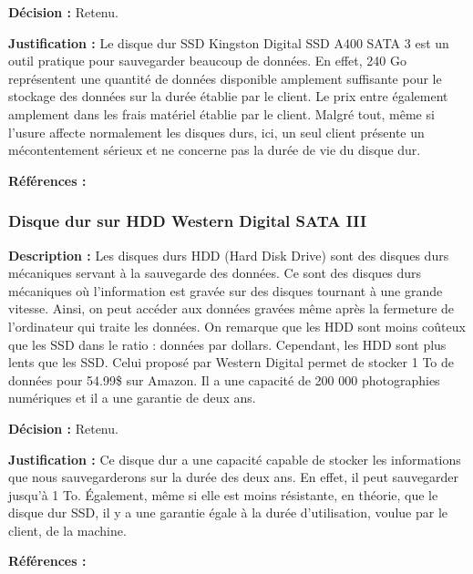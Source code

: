 \textbf{Décision :} Retenu.

\textbf{Justification :} Le disque dur SSD Kingston Digital SSD A400 SATA 3 est un outil pratique pour sauvegarder beaucoup de données. En effet, 240 Go représentent une quantité de données disponible amplement suffisante pour le stockage des données sur la durée établie par le client. Le prix entre également amplement dans les frais matériel établie par le client. Malgré tout, même si l’usure affecte normalement les disques durs, ici, un seul client présente un mécontentement sérieux et ne concerne pas la durée de vie du disque dur.

\textbf{Références :} \cite{AMSSD} \cite{DESSD}

\subsubsection{Disque dur sur HDD Western Digital SATA III }

\textbf{Description :} Les disques durs HDD (Hard Disk Drive) sont des disques durs mécaniques servant à la sauvegarde des données. Ce sont des disques durs mécaniques où l’information est gravée sur des disques tournant à une grande vitesse. Ainsi, on peut accéder aux données gravées même après la fermeture de l’ordinateur qui traite les données. On remarque que les HDD sont moins coûteux que les SSD dans le ratio : données par dollars. Cependant, les HDD sont plus lents que les SSD. Celui proposé par Western Digital permet de stocker 1 To de données pour 54.99\$ sur Amazon. Il a une capacité de 200 000 photographies numériques et il a une garantie de deux ans. 

\textbf{Décision :} Retenu.

\textbf{Justification :} Ce disque dur a une capacité capable de stocker les informations que nous sauvegarderons sur la durée des deux ans. En effet, il peut sauvegarder jusqu’à 1 To. Également, même si elle est moins résistante, en théorie, que le disque dur SSD, il y a une garantie égale à la durée d’utilisation, voulue par le client, de la machine.

\textbf{Références :} \cite{HDD1} \cite{HDD2}

\begin{table}[!htb]
\footnotesize
\centering
{}
\caption{Faisabilité des concepts pour le stockage de données}
\label{t:Decision_stockage}
\end{table}



